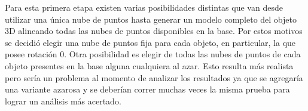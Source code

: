 Para esta primera etapa existen varias posibilidades distintas que van desde utilizar una única nube de puntos hasta generar un modelo completo del objeto 3D alineando todas las nubes de puntos disponibles en la base.  Por estos motivos se decidió elegir una nube de puntos fija para cada objeto, en particular, la que posee rotación 0. Otra posibilidad es elegir de todas las nubes de puntos de cada objeto presentes en la base alguna cualquiera al azar. Esto resulta más realista pero sería un problema al momento de analizar los resultados ya que se agregaría una variante azarosa y se deberían correr muchas veces la misma prueba para lograr un análisis más acertado.


